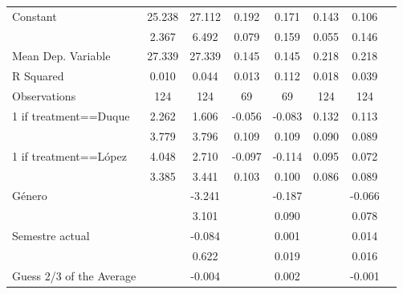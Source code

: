 \begin{table}[H]
{\begin{threeparttable}
\begin{tabular}{lccccccc}
Constant            &      25.238\sym{***}&      27.112\sym{***}&       0.192\sym{**} &       0.171         &       0.143\sym{**} &       0.106         \\
                    &       2.367         &       6.492         &       0.079         &       0.159         &       0.055         &       0.146         \\
Mean Dep. Variable  &      27.339         &      27.339         &       0.145         &       0.145         &       0.218         &       0.218         \\
R Squared           &       0.010         &       0.044         &       0.013         &       0.112         &       0.018         &       0.039         \\
Observations        &         124         &         124         &          69         &          69         &         124         &         124         \\
\midrule
1 if treatment==Duque&       2.262         &       1.606         &      -0.056         &      -0.083         &       0.132         &       0.113         \\
                    &       3.779         &       3.796         &       0.109         &       0.109         &       0.090         &       0.089         \\
1 if treatment==López&       4.048         &       2.710         &      -0.097         &      -0.114         &       0.095         &       0.072         \\
                    &       3.385         &       3.441         &       0.103         &       0.100         &       0.086         &       0.089         \\
Género             &                     &      -3.241         &                     &      -0.187\sym{**} &                     &      -0.066         \\
                    &                     &       3.101         &                     &       0.090         &                     &       0.078         \\
Semestre actual     &                     &      -0.084         &                     &       0.001         &                     &       0.014         \\
                    &                     &       0.622         &                     &       0.019         &                     &       0.016         \\
Guess 2/3 of the Average&                     &      -0.004         &                     &       0.002         &                     &      -0.001         \\

\end{tabular}
\end{threeparttable}}
\end{table}
